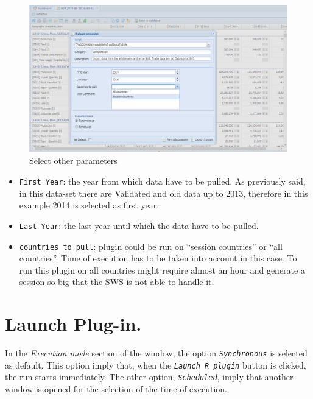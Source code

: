 \documentclass[]{article}
\providecommand{\tightlist}{%
  \setlength{\itemsep}{0pt}\setlength{\parskip}{0pt}}
\begin{document}
\begin{figure}[H]

{\centering \includegraphics[width=1\linewidth]{images/pullData/15_selectyearsCountries} 

}

\caption{\label{fig:f15}Select other parameters}\label{fig:f15}
\end{figure}

\begin{itemize}
\tightlist
\item
  \texttt{First\ Year}: the year from which data have to be pulled. As
  previously said, in this data-set there are Validated and old data up
  to 2013, therefore in this example 2014 is selected as first year.
\item
  \texttt{Last\ Year}: the last year until which the data have to be
  pulled.
\item
  \texttt{countries\ to\ pull}: plugin could be run on ``session
  countries'' or ``all countries''. Time of execution has to be taken
  into account in this case. To run this plugin on all countries might
  require almost an hour and generate a session so big that the SWS is
  not able to handle it.
\end{itemize}

\section{Launch Plug-in.}\label{launch-plug-in.}

In the \emph{Execution mode} section of the window, the option
\emph{\texttt{Synchronous}} is selected as default. This option imply
that, when the \emph{\texttt{Launch\ R\ plugin}} button is clicked, the
run starts immediately. The other option, \emph{\texttt{Scheduled}},
imply that another window is opened for the selection of the time of
execution.
\end{document}
